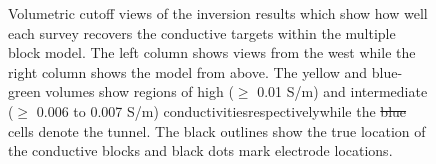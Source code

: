 \documentclass[preprint,authoryear,12pt]{elsarticle}
\providecommand{\DIFaddtex}[1]{{\protect\color{blue}\uwave{#1}}} %
\providecommand{\DIFdeltex}[1]{{\protect\color{red}\sout{#1}}}                      %
\providecommand{\DIFaddFL}[1]{\DIFadd{#1}} %
\providecommand{\DIFdelFL}[1]{\DIFdel{#1}} %
\providecommand{\DIFaddbeginFL}{} %
\providecommand{\DIFaddendFL}{} %
\providecommand{\DIFdelbeginFL}{} %
\providecommand{\DIFdelendFL}{} %
\providecommand{\DIFadd}[1]{\texorpdfstring{\DIFaddtex{#1}}{#1}} %
\providecommand{\DIFdel}[1]{\texorpdfstring{\DIFdeltex{#1}}{}} %
\begin{document}
\begin{figure}[htp]{}
\begin{center}
   \DIFdelendFL \end{center}
\vspace{-0.55cm}
\caption{Volumetric cutoff views of the inversion results which show how well each survey recovers the conductive targets within the multiple block model. The left column shows views from the west while the right column shows the model from above. The yellow and blue-green volumes show regions of high ($\geq$ 0.01 S/m) and intermediate ($\geq$ 0.006 to 0.007 S/m) conductivities\DIFaddbeginFL \DIFaddFL{, }\DIFaddendFL respectively\DIFaddbeginFL \DIFaddFL{, }\DIFaddendFL while the \DIFdelbeginFL \DIFdelFL{blue }\DIFdelendFL \DIFaddbeginFL \DIFaddFL{dark purple }\DIFaddendFL cells denote the tunnel. The black outlines show the true location of the conductive blocks and black dots mark electrode locations.}
\label{fig:StraightTunnel_MultiBlk_Isosurfaces}
\end{figure}
\end{document}
